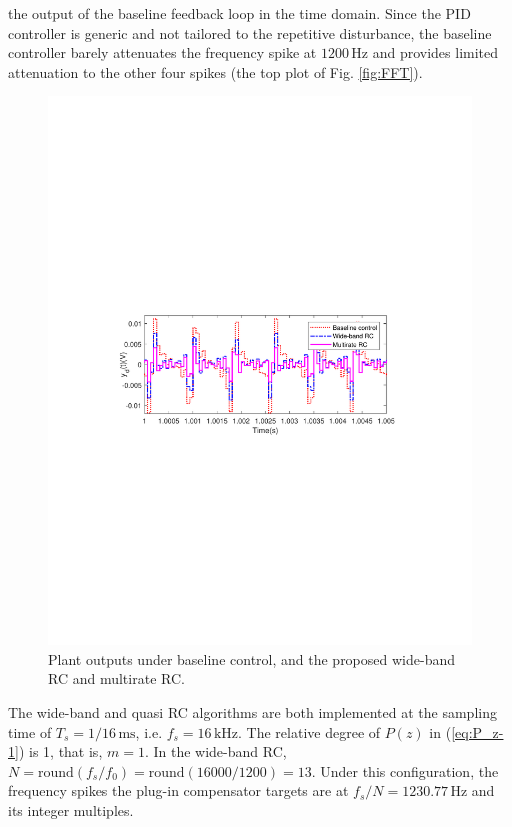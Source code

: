 \documentclass [11pt, proquest] {uwthesis}[2020/02/24]
\begin{document}
the output of the baseline feedback loop in the time domain. Since
the PID controller is generic and not tailored to the repetitive disturbance,
the baseline controller barely attenuates the frequency spike at $1200\,\text{Hz}$
and provides limited attenuation to the other four spikes (the top
plot of Fig. \ref{fig:FFT}).
\begin{figure}[!ht]
\begin{centering}
\includegraphics[width=12cm]{Fractional-order-RC/wideband_baseline_multirate_time}
\par\end{centering}
\caption{\label{fig:Yd(t)_wideband-multirate}Plant outputs under baseline
control, and the proposed wide-band RC and multirate RC.}
\end{figure}
The wide-band and quasi RC algorithms are both implemented at the
sampling time of $T_{s}=1/16\,\text{ms}$, i.e. $f_{s}=16\,\text{kHz}$.
The relative degree of $P(z)$ in (\ref{eq:P_z-1}) is 1, that is,
$m=1$. In the wide-band RC, $N=\text{round}(f_{s}/f_{0})=\text{round}(16000/1200)=13$.
Under this configuration, the frequency spikes the plug-in compensator
targets are at $f_{s}/N=1230.77\,\text{Hz}$ and its integer multiples.
\end{document}
